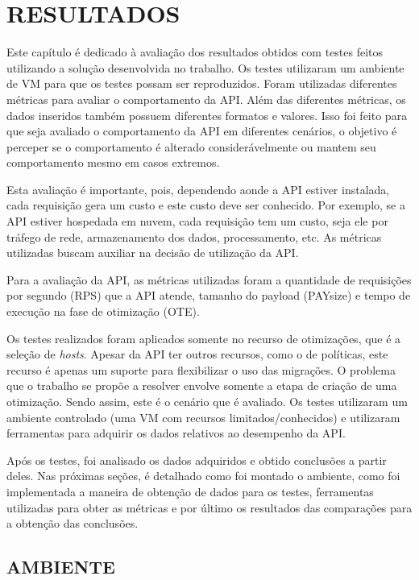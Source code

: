 \chapter{RESULTADOS}
\label{chap:results}

Este capítulo é dedicado à avaliação dos resultados obtidos com testes
feitos utilizando a solução desenvolvida no trabalho. Os testes
utilizaram um ambiente de VM para que os testes possam ser reproduzidos. 
Foram utilizadas diferentes métricas para avaliar
o comportamento da API. Além das diferentes métricas, os dados inseridos 
também possuem diferentes formatos e valores. Isso foi feito para que 
seja avaliado o comportamento da API em diferentes cenários, o objetivo é perceper
se o comportamento é alterado considerávelmente ou mantem seu comportamento
mesmo em casos extremos.

Esta avaliação é importante, pois,
dependendo aonde a API estiver instalada, cada requisição gera um custo e este custo 
deve ser conhecido. Por exemplo, se a API estiver hospedada em nuvem, cada requisição tem 
um custo, seja ele por tráfego de rede, armazenamento dos dados, processamento, etc. 
As métricas utilizadas buscam auxiliar na decisão de utilização da API.

Para a avaliação da API, as métricas utilizadas foram a quantidade de requisições por segundo (RPS)
que a API atende, tamanho do payload (PAYsize) e tempo de execução na fase de otimização (OTE).

Os testes realizados foram aplicados somente no recurso de otimizações,
que é a seleção de \textit{hosts}. Apesar da API ter outros recursos, como o de políticas,
este recurso é apenas um suporte para flexibilizar o uso das migrações. O problema 
que o trabalho se propõe a resolver envolve somente a etapa de criação de uma
otimização. Sendo assim, este é o cenário que é avaliado. Os testes utilizaram um 
ambiente controlado (uma VM com recursos limitados/conhecidos) e utilizaram ferramentas para 
adquirir os dados relativos ao desempenho da API.

Após os testes, foi analisado os dados adquiridos e obtido conclusões a partir deles.
Nas próximas seções, é detalhado como foi montado o ambiente, 
como foi implementada a maneira de obtenção de dados para os testes,
ferramentas utilizadas para obter as métricas e por último os resultados das comparações 
para a obtenção das conclusões.

\section{AMBIENTE}

